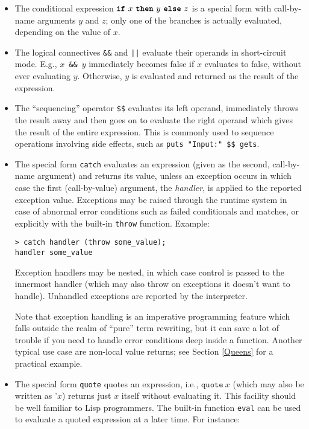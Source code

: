 \documentclass[a4paper,12pt]{article}
\newcommand{\kw}[1]{\texttt{\textbf{#1}}}
\begin{document}
\begin{itemize}
\item The conditional expression $\kw{if}\ x\ \kw{then}\ y\ \kw{else}\ z$ is a special form with call-by-name arguments $y$ and $z$; only one of the branches is actually evaluated, depending on the value of $x$.
\item The logical connectives \verb|&&| and \verb?||? evaluate their operands in short-circuit mode. E.g., $x$\ \verb|&&|\ $y$ immediately becomes false if $x$ evaluates to false, without ever evaluating $y$. Otherwise, $y$ is evaluated and returned as the result of the expression.
\item The ``sequencing'' operator \verb|$$| evaluates its left operand, immediately throws the result away and then goes on to evaluate the right operand which gives the result of the entire expression. This is commonly used to sequence operations involving side effects, such as \verb|puts "Input:" $$ gets|.
\item The special form \verb|catch| evaluates an expression (given as the second, call-by-name argument) and returns its value, unless an exception occurs in which case the first (call-by-value) argument, the \emph{handler}, is applied to the reported exception value. Exceptions may be raised through the runtime system in case of abnormal error conditions such as failed conditionals and matches, or explicitly with the built-in \lstinline|throw| function. Example:

\begin{lstlisting}
> catch handler (throw some_value);
handler some_value
\end{lstlisting}

Exception handlers may be nested, in which case control is passed to the innermost handler (which may also throw on exceptions it doesn't want to handle). Unhandled exceptions are reported by the interpreter.

Note that exception handling is an imperative programming feature which falls outside the realm of ``pure'' term rewriting, but it can save a lot of trouble if you need to handle error conditions deep inside a function. Another typical use case are non-local value returns; see Section \ref{Queens} for a practical example.
\item The special form \lstinline|quote| quotes an expression, i.e., $\texttt{quote}\ x$ (which may also be written as $\texttt{'}x$) returns just $x$ itself without evaluating it. This facility should be well familiar to Lisp programmers. The built-in function \lstinline|eval| can be used to evaluate a quoted expression at a later time. For instance:


\end{itemize}
\end{document}
